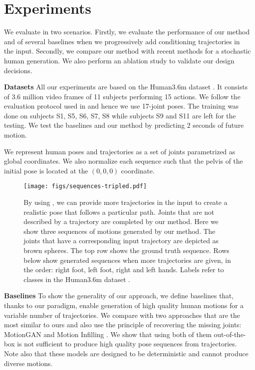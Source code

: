 \documentclass[10pt,twocolumn,letterpaper]{article}
\renewcommand{\paragraph}[1]{\noindent\textbf{#1}\enskip}
\begin{document}
\section{Experiments}

We evaluate \trajevae{} in two scenarios. Firstly, we evaluate the
performance of our method and of several baselines when we progressively add conditioning trajectories in the input. Secondly, we compare our method with
recent methods for a stochastic human generation. 
We also perform an ablation study to validate our design decisions.

\paragraph{Datasets} 
All our experiments are based on the Human3.6m dataset \cite{ionescu2013human3}.
It consists of 3.6 million video frames of 11 subjects performing 15 actions. 
We follow the evaluation protocol used in \cite{yuan2020dlow} and hence we use 17-joint poses. The training was done on subjects S1, S5, S6, S7, S8 while subjects S9 and S11 are left for the testing. We test the baselines and our method by predicting 2 seconds of future motion.

We represent human poses and trajectories as a set of joints parametrized as global coordinates. We also normalize each sequence such that the pelvis of the initial pose is located at the $(0, 0, 0)$ coordinate.
\begin{figure*}[t!]
    \centering
    \texttt{[image: figs/sequences-tripled.pdf]}
    \caption{By using \trajevae{}, we can provide more trajectories in the
    input to create a realistic pose that follows a particular path. Joints that are not described by a trajectory are completed by our method. Here we show three sequences of motions generated by our method.  The joints that have a corresponding input trajectory are depicted as brown spheres. The top row shows the ground truth sequence. Rows below show generated sequences when more trajectories are given, in the order: right foot, left foot, right and left hands. Labels refer to classes in the Human3.6m dataset \cite{ionescu2013human3}.}
    \label{fig:sequences}
    \vspace{-0.5em}
\end{figure*}

\paragraph{Baselines}
To show the generality of our approach, we define baselines that, thanks to our paradigm, enable
generation of high quality human motions for a variable number of trajectories. We compare \trajevae{} with two approaches that are the most similar to ours and also use the principle of recovering the missing joints: MotionGAN \cite{hernandez2019human} and Motion Infilling \cite{kaufmann2020convolutional}. We show that using both of them out-of-the-box is not sufficient to produce high quality pose sequences from trajectories. Note also that these models are designed to be deterministic  and cannot produce diverse motions.
\end{document}
